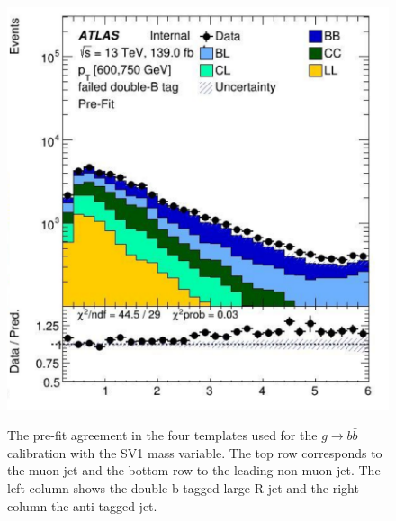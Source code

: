 \documentclass[10pt,a4paper]{book}
\begin{document}
\begin{figure}
    \includegraphics[width=0.485\linewidth]{ftag/sv1Fit/prefit/nonmuon_fail.png} \\
    \caption{The pre-fit agreement in the four templates used for the $g\rightarrow b \bar{b}$ calibration with the SV1 mass variable. The top row corresponds to the muon jet and the bottom row to the leading non-muon jet. The left column shows the double-b tagged large-R jet and the right column the anti-tagged jet.}
    \label{fig:prefit_sv1}
\end{figure}
\end{document}
